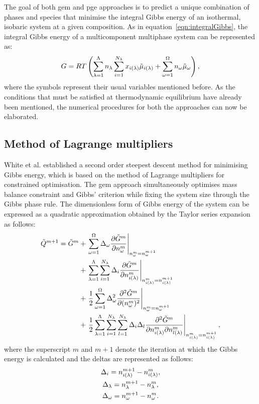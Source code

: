 The goal of both \gls{gem} and \gls{pge} approaches is to predict a unique combination of phases and species that minimise the integral Gibbs energy of an isothermal, isobaric system at a given composition. As in equation~\eqref{eqn:integralGibbs}, the integral Gibbs energy of a multicomponent multiphase system can be represented as:
\begin{equation}\label{eq:int_gibbs}
    G = RT \left(\sumsolnphase \molesol \sumspecies \molefrac{i} \cps{i} + \sumstoichphase \molestoich \cpst\right),
\end{equation}
where the symbols represent their usual variables mentioned before. 
As the conditions that must be satisfied at thermodynamic equilibrium have already been mentioned, the numerical procedures for  both the approaches can now be elaborated.

\subsection{Method of Lagrange multipliers}
White et al. \cite{White:58} established a second order steepest descent method for minimising Gibbs energy, which is based on the method of Lagrange multipliers for constrained optimisation. The \gls{gem} approach simultaneously optimises mass balance constraint and Gibbs' criterion while fixing the system size through the Gibbs phase rule. The dimensionless form of Gibbs energy of the system can be expressed as a quadratic approximation obtained by the Taylor series expansion as follows:
  \begin{equation}\label{eq:GibbsTaylor}
    \begin{split}
      \tilde{Q}^{m+1} = \tilde{G}^{m} &+ \left .\sumstoichphase \Delta_{\omega} \pder{\tilde{G}^m}{\molestoich^m} \right \vert_{\molestoich^m = \molestoich^{m+1}} \\
                      &+ \left . \sumsolnphase \sumspecies \Delta_i \pder{\tilde{G}^m}{\molespecies{i}^m}\right \vert_{\molespecies{i}^m = \molespecies{i}^{m+1}} \\
                      &+ \left . \frac{1}{2} \sumstoichphase \Delta^2_{\omega} \ppder{\tilde{G}^m}{\molestoich^m} \right \vert_{\molestoich^m = \molestoich^{m+1}} \\
                      &+ \left . \frac{1}{2} \sumsolnphase \sumspecies \sumspecies[l] \Delta_i \Delta_l \pqder{\tilde{G}^m}{\molespecies{i}^m}{\molespecies{l}^m} \right \vert_{\molespecies{i}^m = \molespecies{i}^{m+1}},
    \end{split}
  \end{equation}
where the superscript $m$ and $m+1$ denote the iteration at which the Gibbs energy is calculated and the deltas are represented as follows:
  \begin{gather}
      \Delta_i = \molespecies{i}^{m+1} - \molespecies{i}^{m},\\
      \Delta_\lambda = \molesol^{m+1} - \molesol^{m}, \\
      \Delta_\omega = \molestoich^{m+1} - \molestoich^{m}.
  \end{gather}


